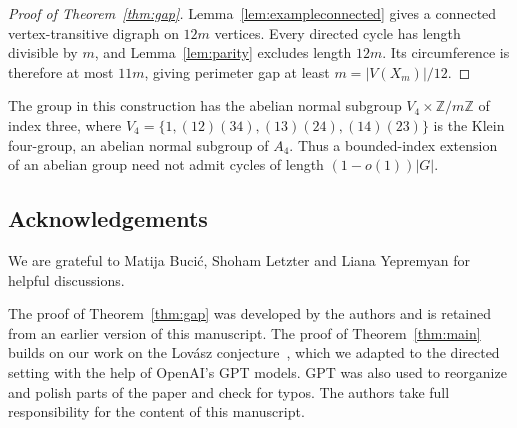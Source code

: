 \documentclass[11pt,a4paper,reqno]{amsart}
\theoremstyle{definition}
\theoremstyle{remark}
\numberwithin{equation}{section}
\newcommand{\Z}{\mathbb Z}
\begin{document}
\begin{proof}[Proof of Theorem~\ref{thm:gap}]
Lemma~\ref{lem:exampleconnected} gives a connected vertex-transitive digraph on $12m$ vertices. Every directed cycle has length divisible by $m$, and Lemma~\ref{lem:parity} excludes length $12m$. Its circumference is therefore at most $11m$, giving perimeter gap at least $m=|V(X_m)|/12$.
\end{proof}


The group in this construction has the abelian normal subgroup $V_4\times\Z/m\Z$ of index three, where $V_4=\{1,(12)(34),(13)(24),(14)(23)\}$ is the Klein four-group, an abelian normal subgroup of $A_4$. Thus a bounded-index extension of an abelian group need not admit cycles of length $(1-o(1))|G|$.

\begin{samepage}
\section*{Acknowledgements}
We are grateful to Matija Buci\'c, Shoham Letzter and Liana Yepremyan for helpful discussions.

The proof of Theorem~\ref{thm:gap} was developed by the authors and is retained from an earlier version of this manuscript. The proof of Theorem~\ref{thm:main} builds on our work on the Lov\'asz conjecture~\cite{LiMethuku}, which we adapted to the directed setting with the help of OpenAI's GPT models. GPT was also used to reorganize and polish parts of the paper and check for typos. The authors take full responsibility for the content of this manuscript.

\end{samepage}
\end{document}
